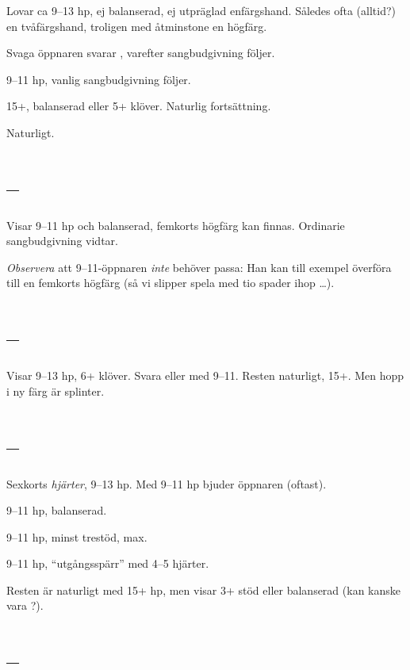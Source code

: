 Lovar ca 9--13 hp, ej balanserad, ej utpräglad enfärgshand. Således ofta
(alltid?) en tvåfärgshand, troligen med åtminstone en högfärg.

Svaga öppnaren svarar , varefter sangbudgivning följer.

\bbe
\item[\NT{1}] 9--11 hp, vanlig sangbudgivning följer.
\item[\kl{2}] 15+, balanserad eller 5+ klöver. Naturlig fortsättning.
\item[resten] Naturligt.
  \ebe
  

\section{ -- } \nytt

Visar 9--11 hp och balanserad, femkorts högfärg kan finnas. Ordinarie
sangbudgivning vidtar.

\emph{Observera} att 9--11-öppnaren \emph{inte} behöver
passa: Han kan till exempel överföra till en femkorts högfärg (så vi
slipper spela  med tio spader ihop \ldots).

\section{ -- } \nytt

Visar 9--13 hp, 6+ klöver. Svara \pass eller  med 9--11. Resten
naturligt, 15+. Men hopp i ny färg är splinter.

\section{ -- } \nytt

Sexkorts \emph{hjärter}, 9--13 hp. Med 9--11 hp bjuder öppnaren 
 (oftast).

\bbe
\item[\hj{2}] 9--11 hp, balanserad.
\item[\hj{3}] 9--11 hp, minst trestöd, max.
\item[\hj{4}] 9--11 hp, ``utgångsspärr'' med 4--5 hjärter.
\ebe

Resten är naturligt med 15+ hp, men  visar 3+ stöd eller balanserad
(kan kanske vara ?).

\section{ -- } \nytt


